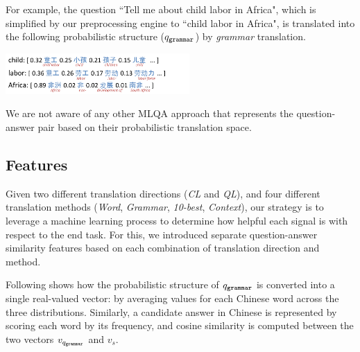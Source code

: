 \documentclass{sig-alternate-05-2015}
\newcommand{\red}[1]{\textcolor{red}{#1}}
\begin{document}
\vspace{-0.25cm}
For example, the question ``Tell me about child 
labor in Africa", which is simplified by our preprocessing engine to ``child labor in Africa", is translated into the following 
probabilistic structure ($q_{{\tt grammar}}$) by \emph{grammar} translation.

\includegraphics[width=7cm]{example.pdf}

We are not aware of any other MLQA approach that represents the question-answer pair based on their probabilistic translation
space.
 
\subsection{Features}\label{sec:feat}


Given two different translation directions (\emph{CL} and \emph{QL}), and four different translation methods (\emph{Word}, 
\emph{Grammar}, \emph{10-best}, \emph{Context}), our strategy is to leverage a machine learning process to determine how 
helpful each signal is with respect to the end task. For this, we introduced separate question-answer similarity features based 
on each combination of translation direction and method. 

Following shows how the probabilistic structure of $q_{{\tt grammar}}$ is converted into a single real-valued vector:
by averaging values for each Chinese word across the three distributions.
Similarly, a candidate answer in Chinese is represented by scoring each word by its frequency, and cosine similarity
is computed between the two vectors $v_{q_{{\tt grammar}}}$ and $v_s$.
\end{document}
